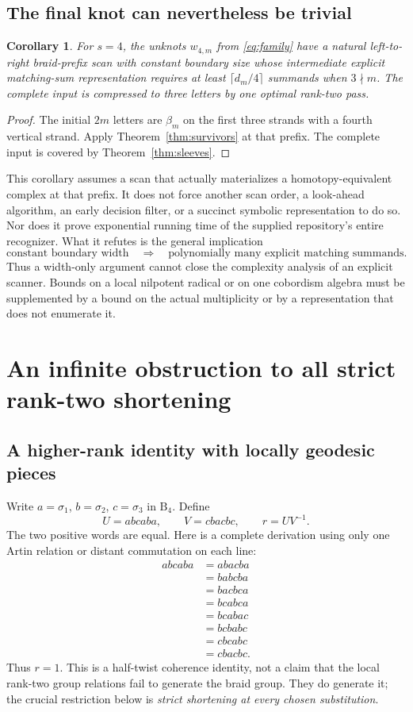 \documentclass[11pt]{article}
\newtheorem{corollary}[theorem]{Corollary}
\theoremstyle{definition}
\theoremstyle{remark}
\newcommand{\B}{\mathrm B}
\begin{document}
\subsection{The final knot can nevertheless be trivial}
\begin{corollary}\label{cor:easyfinal}
For $s=4$, the unknots $w_{4,m}$ from \eqref{eq:family} have a natural
left-to-right braid-prefix scan with constant boundary size whose
intermediate explicit matching-sum representation requires at least
$\lceil d_m/4\rceil$ summands when $3\nmid m$. The complete input is
compressed to three letters by one optimal rank-two pass.
\end{corollary}
\begin{proof}
The initial $2m$ letters are $\beta_m$ on the first three strands with a
fourth vertical strand. Apply Theorem~\ref{thm:survivors} at that prefix.
The complete input is covered by Theorem~\ref{thm:sleeves}.
\end{proof}

This corollary assumes a scan that actually materializes a homotopy-equivalent
complex at that prefix. It does not force another scan order, a look-ahead
algorithm, an early decision filter, or a succinct symbolic representation
to do so. Nor does it prove exponential running time of the supplied
repository's entire recognizer. What it refutes is the general implication
\[
 \text{constant boundary width}\quad\Longrightarrow\quad
 \text{polynomially many explicit matching summands}.
\]
Thus a width-only argument cannot close the complexity analysis of an
explicit scanner. Bounds on a local nilpotent radical or on one cobordism
algebra must be supplemented by a bound on the actual multiplicity or by a
representation that does not enumerate it.

\section{An infinite obstruction to all strict rank-two shortening}
\subsection{A higher-rank identity with locally geodesic pieces}
Write $a=\sigma_1$, $b=\sigma_2$, $c=\sigma_3$ in $\B_4$. Define
\[
 U=abcaba,\qquad V=cbacbc,\qquad r=UV^{-1}.
\]
The two positive words are equal. Here is a complete derivation using only
one Artin relation or distant commutation on each line:
\begin{align*}
 abcaba&=abacba\\
       &=babcba\\
       &=bacbca\\
       &=bcabca\\
       &=bcabac\\
       &=bcbabc\\
       &=cbcabc\\
       &=cbacbc.
\end{align*}
Thus $r=1$. This is a half-twist coherence identity, not a claim that the
local rank-two group relations fail to generate the braid group. They do
generate it; the crucial restriction below is \emph{strict shortening at
every chosen substitution}.
\end{document}
